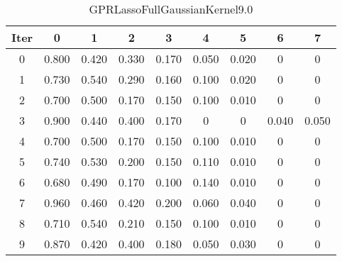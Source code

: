 \begin{table}
	\begin{center}
		\begin{tabular}{|c|c|c|c|c|c|c|c|c|}
			\hline
			Iter & 0 & 1 & 2 & 3 & 4 & 5 & 6 & 7 \\
			\hline
			0 & 0.800 & 0.420 & 0.330 & 0.170 & 0.050 & 0.020 & 0 & 0 \\
			\hline
			1 & 0.730 & 0.540 & 0.290 & 0.160 & 0.100 & 0.020 & 0 & 0 \\
			\hline
			2 & 0.700 & 0.500 & 0.170 & 0.150 & 0.100 & 0.010 & 0 & 0 \\
			\hline
			3 & 0.900 & 0.440 & 0.400 & 0.170 & 0 & 0 & 0.040 & 0.050 \\
			\hline
			4 & 0.700 & 0.500 & 0.170 & 0.150 & 0.100 & 0.010 & 0 & 0 \\
			\hline
			5 & 0.740 & 0.530 & 0.200 & 0.150 & 0.110 & 0.010 & 0 & 0 \\
			\hline
			6 & 0.680 & 0.490 & 0.170 & 0.100 & 0.140 & 0.010 & 0 & 0 \\
			\hline
			7 & 0.960 & 0.460 & 0.420 & 0.200 & 0.060 & 0.040 & 0 & 0 \\
			\hline
			8 & 0.710 & 0.540 & 0.210 & 0.150 & 0.100 & 0.010 & 0 & 0 \\
			\hline
			9 & 0.870 & 0.420 & 0.400 & 0.180 & 0.050 & 0.030 & 0 & 0 \\
			\hline
		\end{tabular}
	\end{center}
	\caption{GPRLassoFullGaussianKernel9.0}
\end{table}